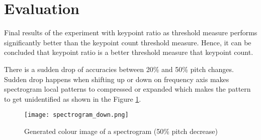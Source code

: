 \section{Evaluation}

Final results of the experiment with keypoint ratio as threshold measure performs significantly better
than the keypoint count threshold measure. Hence, it can be concluded that keypoint ratio is a better
threshold measure that keypoint count.
\vspace{12pt}

There is a sudden drop of accuracies between 20\% and 50\% pitch changes. Sudden drop happens when shifting
up or down on frequency axis makes spectrogram local patterns to compressed or expanded which makes the pattern
to get unidentified as shown in the Figure \ref{fig:spectrogram_down}.


\begin{figure}[H]
    \centering
    \texttt{[image: spectrogram\_down.png]}
    \caption{Generated colour image of a spectrogram (50\% pitch decrease)}
    \label{fig:spectrogram_down}
  \end{figure}